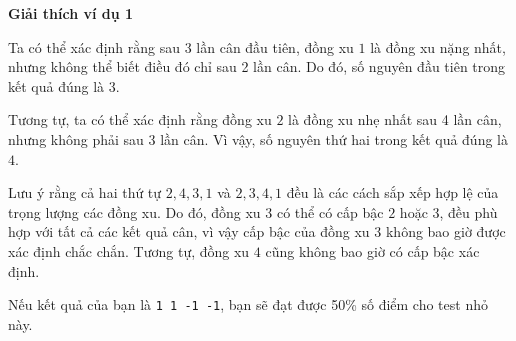 \textbf{Giải thích ví dụ 1}

Ta có thể xác định rằng sau 3 lần cân đầu tiên, đồng xu $1$ là đồng xu nặng nhất, 
nhưng không thể biết điều đó chỉ sau 2 lần cân. 
Do đó, số nguyên đầu tiên trong kết quả đúng là $3$.

Tương tự, ta có thể xác định rằng đồng xu $2$ là đồng xu nhẹ nhất sau 4 lần cân, 
nhưng không phải sau 3 lần cân. 
Vì vậy, số nguyên thứ hai trong kết quả đúng là $4$.

Lưu ý rằng cả hai thứ tự $2,4,3,1$ và $2,3,4,1$ đều là các cách sắp xếp hợp lệ của trọng lượng các đồng xu.  
Do đó, đồng xu $3$ có thể có cấp bậc $2$ hoặc $3$, đều phù hợp với tất cả các kết quả cân, 
vì vậy cấp bậc của đồng xu $3$ không bao giờ được xác định chắc chắn.  
Tương tự, đồng xu $4$ cũng không bao giờ có cấp bậc xác định.

Nếu kết quả của bạn là \texttt{1 1 -1 -1}, bạn sẽ đạt được 50\% số điểm cho test nhỏ này.

